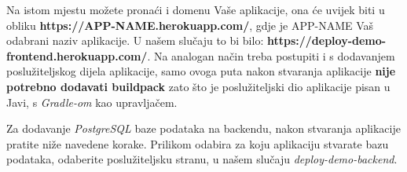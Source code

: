 			Na istom mjestu možete pronaći i domenu Vaše aplikacije, ona će uvijek biti u obliku \textbf{https://APP-NAME.herokuapp.com/}, gdje je APP-NAME Vaš odabrani naziv aplikacije. U našem slučaju to bi bilo: \textbf{https://deploy-demo-frontend.herokuapp.com/}.
			Na analogan način treba postupiti i s dodavanjem poslužiteljskog dijela aplikacije, samo ovoga puta nakon stvaranja aplikacije \textbf{nije potrebno dodavati buildpack} zato što je poslužiteljski dio aplikacije pisan u Javi, s \textit{Gradle-om} kao upravljačem.
			
			Za dodavanje \textit{PostgreSQL} baze podataka na backendu, nakon stvaranja aplikacije pratite niže navedene korake. Prilikom odabira za koju aplikaciju stvarate bazu podataka, odaberite poslužiteljsku stranu, u našem slučaju \textit{deploy-demo-backend}.
			
